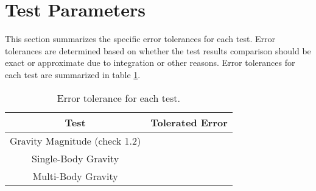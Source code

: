 \section{Test Parameters}

This section summarizes the  specific error tolerances for each test. Error tolerances are determined based on whether the test results comparison should be exact or approximate due to integration or other reasons. Error tolerances for each test are summarized in table \ref{tab:errortol}. \\
	
	\begin{table}[htbp]
		\caption{Error tolerance for each test.}
		\label{tab:errortol}
		\centering \fontsize{10}{10}\selectfont
		\begin{tabular}{ c | c } %
			\hline
			\textbf{Test}   							    & \textbf{Tolerated Error} 						  \\ \hline
			Gravity Magnitude (check 1.2)        & 		   \\ \hline
			Single-Body Gravity						   & 														   \\ \hline
			Multi-Body Gravity 						   & 	 		       \\ \hline
		\end{tabular}
	\end{table}